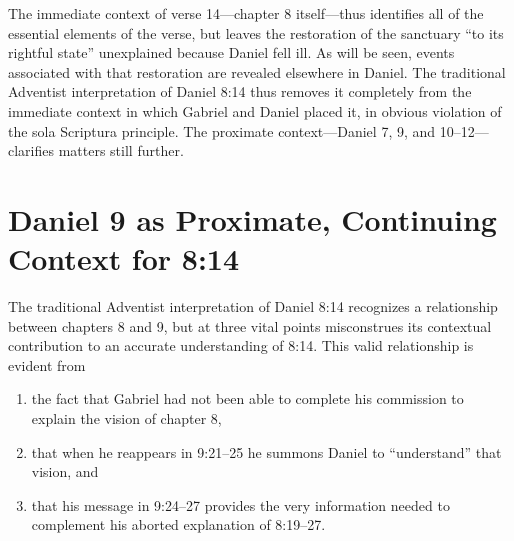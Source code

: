 The immediate context of verse 14---chapter 8 itself---thus identifies all
of the essential elements of the verse, but leaves the restoration of
the sanctuary ``to its rightful state'' unexplained because Daniel fell
ill. As will be seen, events associated with that restoration are
revealed elsewhere in Daniel. The traditional Adventist interpretation of
Daniel 8:14 thus removes it completely from the immediate context in which
Gabriel and Daniel placed it, in obvious violation of the sola Scriptura 
principle. The proximate context---Daniel 7, 9, and 10--12---clarifies
matters still further.

\section{Daniel 9 as Proximate, Continuing Context for 8:14}

The traditional Adventist interpretation of Daniel 8:14 recognizes a
relationship between chapters 8 and 9, but at three vital points
misconstrues its contextual contribution to an accurate understanding of
8:14. This valid relationship is evident from
\begin{enumerate}
	\item the fact that
Gabriel had not been able to complete his commission to explain the vision
        of chapter 8, 
	\item that when he reappears in 9:21--25 he summons Daniel to
``understand'' that vision, and 
	\item that his message in 9:24--27 provides the
very information needed to complement his aborted explanation of 8:19--27.
\end{enumerate}

